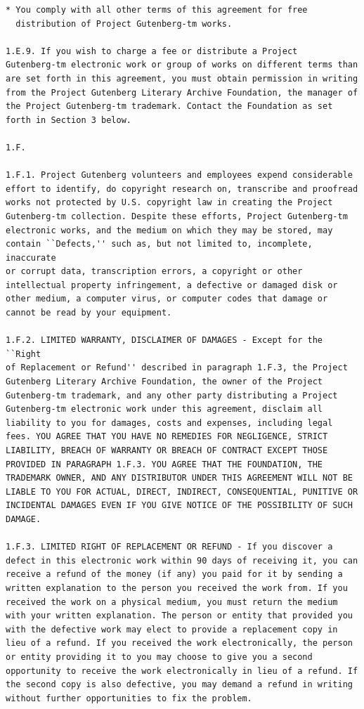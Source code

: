 \documentclass[11pt,oneside]{book}
\begin{document}
\begin{verbatim}
* You comply with all other terms of this agreement for free
  distribution of Project Gutenberg-tm works.

1.E.9. If you wish to charge a fee or distribute a Project
Gutenberg-tm electronic work or group of works on different terms than
are set forth in this agreement, you must obtain permission in writing
from the Project Gutenberg Literary Archive Foundation, the manager of
the Project Gutenberg-tm trademark. Contact the Foundation as set
forth in Section 3 below.

1.F.

1.F.1. Project Gutenberg volunteers and employees expend considerable
effort to identify, do copyright research on, transcribe and proofread
works not protected by U.S. copyright law in creating the Project
Gutenberg-tm collection. Despite these efforts, Project Gutenberg-tm
electronic works, and the medium on which they may be stored, may
contain ``Defects,'' such as, but not limited to, incomplete, inaccurate
or corrupt data, transcription errors, a copyright or other
intellectual property infringement, a defective or damaged disk or
other medium, a computer virus, or computer codes that damage or
cannot be read by your equipment.

1.F.2. LIMITED WARRANTY, DISCLAIMER OF DAMAGES - Except for the ``Right
of Replacement or Refund'' described in paragraph 1.F.3, the Project
Gutenberg Literary Archive Foundation, the owner of the Project
Gutenberg-tm trademark, and any other party distributing a Project
Gutenberg-tm electronic work under this agreement, disclaim all
liability to you for damages, costs and expenses, including legal
fees. YOU AGREE THAT YOU HAVE NO REMEDIES FOR NEGLIGENCE, STRICT
LIABILITY, BREACH OF WARRANTY OR BREACH OF CONTRACT EXCEPT THOSE
PROVIDED IN PARAGRAPH 1.F.3. YOU AGREE THAT THE FOUNDATION, THE
TRADEMARK OWNER, AND ANY DISTRIBUTOR UNDER THIS AGREEMENT WILL NOT BE
LIABLE TO YOU FOR ACTUAL, DIRECT, INDIRECT, CONSEQUENTIAL, PUNITIVE OR
INCIDENTAL DAMAGES EVEN IF YOU GIVE NOTICE OF THE POSSIBILITY OF SUCH
DAMAGE.

1.F.3. LIMITED RIGHT OF REPLACEMENT OR REFUND - If you discover a
defect in this electronic work within 90 days of receiving it, you can
receive a refund of the money (if any) you paid for it by sending a
written explanation to the person you received the work from. If you
received the work on a physical medium, you must return the medium
with your written explanation. The person or entity that provided you
with the defective work may elect to provide a replacement copy in
lieu of a refund. If you received the work electronically, the person
or entity providing it to you may choose to give you a second
opportunity to receive the work electronically in lieu of a refund. If
the second copy is also defective, you may demand a refund in writing
without further opportunities to fix the problem.


\end{verbatim}
\end{document}
